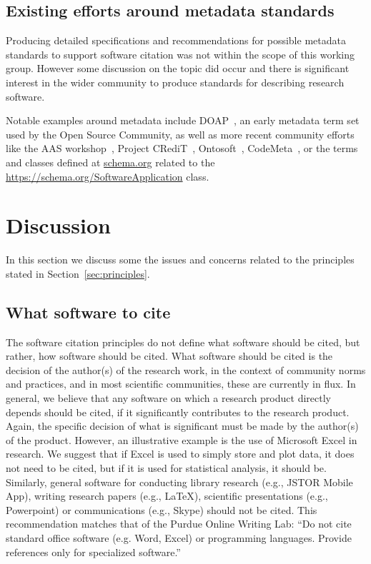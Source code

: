 \documentclass[11pt, oneside]{amsart}
\begin{document}
\subsection{Existing efforts around metadata standards}

Producing detailed specifications and recommendations for possible metadata standards to support software citation was not within the scope of this working group. However some discussion on the topic did occur and there is significant interest in the wider community to produce standards for describing research software.

Notable examples around metadata include DOAP~\cite{DOAP}, an early metadata term set used by the Open Source Community, as well as more recent community efforts like the AAS workshop~\cite{aas-software-index}, Project CRediT~\cite{casrai-credit}, Ontosoft~\cite{ontosoft}, CodeMeta~\cite{codemeta}, or the terms and classes defined at \url{schema.org} related to the \url{https://schema.org/SoftwareApplication} class.

\section{Discussion}
\label{sec:discussion}

In this section we discuss some the issues and concerns related to the principles stated in Section~\ref{sec:principles}.

\subsection{What software to cite}

The software citation principles do not define what software should be cited, but rather, how software should be cited.
What software should be cited is the decision of the author(s) of the research work, in the context of community norms and practices, and in most scientific communities, these are currently in flux.
In general, we believe that any software on which a research product directly depends should be cited, if it significantly contributes to the research product.
Again, the specific decision of what is significant must be made by the author(s) of the product.
However, an illustrative example is the use of Microsoft Excel in research.
We suggest that if Excel is used to simply store and plot data, it does not need to be cited, but if it is used for statistical analysis, it should be.  Similarly, general software for conducting library research (e.g., JSTOR Mobile App), writing research papers (e.g., \LaTeX), scientific presentations (e.g., Powerpoint) or communications (e.g., Skype) should not be cited.
This recommendation matches that of the Purdue Online Writing Lab: ``Do not cite standard office software (e.g. Word, Excel) or programming languages.  Provide references only for specialized software.''~\cite{powl-citing-software}
\end{document}
